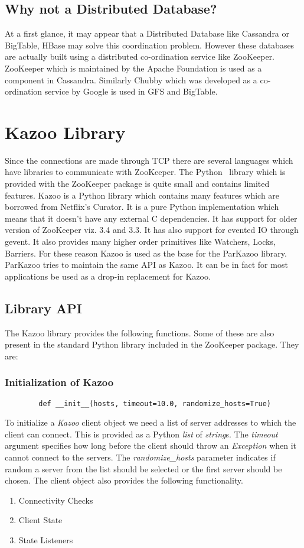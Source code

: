 \subsection{Why not a Distributed Database?}
At a first glance, it may appear that a Distributed Database like Cassandra or BigTable, HBase may solve this coordination problem. However these databases are actually built using a distributed co-ordination service like ZooKeeper. ZooKeeper which is maintained by the Apache Foundation is used as a component in Cassandra. Similarly Chubby which was developed as a co-ordination service by Google is used in GFS and BigTable.

\section{Kazoo Library}
Since the connections are made through TCP there are several languages which have libraries to communicate with ZooKeeper. The Python~\cite{van2002python} library which is provided with the ZooKeeper package is quite small and contains limited features. Kazoo is a Python library which contains many features which are borrowed from Netflix's Curator. It is a pure Python implementation which means that it doesn't have any external C dependencies. It has support for older version of ZooKeeper viz. 3.4 and 3.3. It has also support for evented IO through gevent. It also provides many higher order primitives like Watchers, Locks, Barriers. For these reason Kazoo is used as the base for the ParKazoo library. ParKazoo tries to maintain the same API as Kazoo. It can be in fact for most applications be used as a drop-in replacement for Kazoo.

\subsection{Library API}
The Kazoo library provides the following functions. Some of these are also present in the standard Python library included in the ZooKeeper package. They are:
  \subsubsection{Initialization of Kazoo}
  	\begin{lstlisting}
  		def __init__(hosts, timeout=10.0, randomize_hosts=True)
  	\end{lstlisting}
  	To initialize a \textit{Kazoo} client object we need a list of server addresses to which the client can connect. This is provided as a Python \textit{list} of \textit{string}s. The \textit{timeout} argument specifies how long before the client should throw an \textit{Exception} when it cannot connect to the servers. The \textit{randomize\_hosts} parameter indicates if random a server from the list should be selected or the first server should be chosen.
	The client object also provides the following functionality.
	\begin{enumerate}
		\item Connectivity Checks
		\item Client State
		\item State Listeners
	\end{enumerate}

